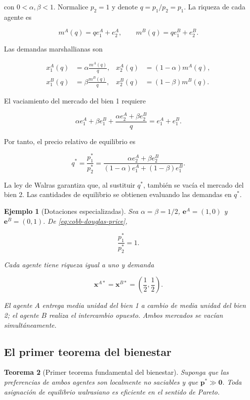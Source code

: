\documentclass[12pt]{article}
\theoremstyle{cideplain}
\newtheorem{theorem}{Teorema}[section]
\theoremstyle{cidedef}
\newtheorem{example}[theorem]{Ejemplo}
\newcommand{\p}{\mathbf{p}}
\newcommand{\e}{\bm e}
\newcommand{\x}{\mathbf{x}}
\begin{document}
con \(0<\alpha,\beta<1\). Normalice \(p_2=1\) y denote \(q=p_1/p_2=p_1\). La riqueza
de cada agente es

\[
  m^A(q)=qe_1^A+e_2^A,
  \qquad
  m^B(q)=qe_1^B+e_2^B.
\]

Las demandas marshallianas son

\begin{align*}
  x_1^A(q)&=\alpha\frac{m^A(q)}{q},
  &x_2^A(q)&=(1-\alpha)m^A(q),\\
  x_1^B(q)&=\beta\frac{m^B(q)}{q},
  &x_2^B(q)&=(1-\beta)m^B(q).
\end{align*}

El vaciamiento del mercado del bien 1 requiere

\[
  \alpha e_1^A+\beta e_1^B
  +\frac{\alpha e_2^A+\beta e_2^B}{q}
  =e_1^A+e_1^B.
\]

Por tanto, el precio relativo de equilibrio es

\begin{equation}
  q^*
  =\frac{p_1^*}{p_2^*}
  =\frac{\alpha e_2^A+\beta e_2^B}
  {(1-\alpha)e_1^A+(1-\beta)e_1^B}.
  \label{eq:cobb-douglas-price}
\end{equation}

La ley de Walras garantiza que, al sustituir \(q^*\), también se vacía el mercado del bien
2. Las cantidades de equilibrio se obtienen evaluando las demandas en \(q^*\).

\begin{example}[Dotaciones especializadas]
Sea \(\alpha=\beta=1/2\), \(\e^A=(1,0)\) y \(\e^B=(0,1)\). De
\eqref{eq:cobb-douglas-price},

\[
  \frac{p_1^*}{p_2^*}=1.
\]

Cada agente tiene riqueza igual a uno y demanda

\[
  \x^{A*}=\x^{B*}=\left(\frac12,\frac12\right).
\]

El agente \(A\) entrega media unidad del bien 1 a cambio de media unidad del bien 2; el
agente \(B\) realiza el intercambio opuesto. Ambos mercados se vacían simultáneamente.
\end{example}

\subsection{El primer teorema del bienestar}

\begin{theorem}[Primer teorema fundamental del bienestar]
Suponga que las preferencias de ambos agentes son localmente no saciables y que
\(\p^*\gg\bm 0\). Toda asignación de equilibrio walrasiano es eficiente en el sentido de
Pareto.
\end{theorem}
\end{document}
